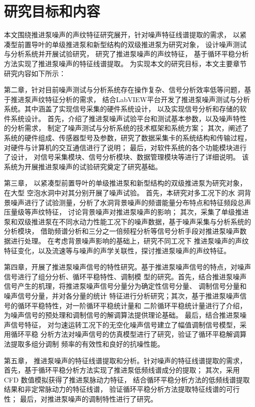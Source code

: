 \section{研究目标和内容}
本文围绕推进泵噪声的声纹特征研究展开，针对噪声特征线谱提取的需求，
以紧凑型前置导叶的单级推进泵和新型结构的双级推进泵为研究对象，
设计噪声测试与分析系统并开展试验研究，
研究了推进泵噪声的声纹特征，
基于循环平稳分析方法实现了推进泵噪声的特征线谱提取。
为实现本文的研究目标，本文主要章节研究内容如下所示：

第二章，针对目前噪声测试与分析系统存在操作复杂、信号分析效率低等问题，基于推进泵声纹特征分析的需求，
结合LabVIEW平台开发了推进泵噪声测试与分析系统。其中涵盖了实现信号采集的硬件系统设计，
以及实现信号分析和存储的软件系统设计。
首先，介绍了推进泵噪声试验平台和测试基本参数，以及噪声特性的分析需求，
制定了噪声测试与分析系统的技术框架和系统方案；
其次，阐述了系统的硬件组成、传感器型号及参数，研究了数据采集卡的系统结构和传输过程，
对硬件与计算机的交互通信进行了说明；
最后，对软件系统的各个功能模块进行了设计，
对信号采集模块、信号分析模块、数据管理模块等进行了详细说明。
该系统为开展推进泵噪声的试验研究奠定了研究基础。

第三章，
以紧凑型前置导叶的单级推进泵和新型结构的双级推进泵为研究对象，在大型
空泡水洞中对其分别开展了噪声试验。
首先，本研究对多工况下的水
洞背景噪声进行了试验测量，分析了水洞背景噪声的频谱能量分布特点和特征频段总声压量级等声纹特征，
讨论背景噪声对推进泵噪声的影响；
其次，采集了单级推进泵和双级推进泵在不同水动力性能工况下的噪声数据，基于噪声采集与分析系统的分析模块，
借助频谱分析和三分之一倍频程分析等信号分析手段对推进泵噪声数据进行处理。
在考虑背景噪声影响的基础上，研究不同工况下
推进泵噪声的声纹特征变化，以及流速等与噪声的声学关联性，探讨推进泵噪声的声纹特征。

第四章，开展了推进泵噪声信号的特性研究。基于推进泵噪声信号的特点，对噪声信号进行了组分分析、循环平稳特性、调制模
型的研究。首先，结合推进泵噪声信号产生的机理，将推进泵噪声信号分量分为确定性信号分量、
调制信号分量和噪声信号分量，并对各分量的统计
特征进行分析研究；其次，基于推进泵噪声信号的循环平稳特性，对一阶循环平稳统计量和
二阶循环平稳统计量进行了介绍，为噪声信号的预处理和调制信号的解调算法提供理论基础。
最后，结合推进泵噪声信号特征，
对匀速运转工况下的无空化噪声信号建立了幅值调制信号模型，采用循环平稳
分析方法对噪声信号的仿真模型进行了研究，验证了循环平稳解调算法提取多组分调制
频率的有效性和良好的抗噪性能。

第五章，
推进泵噪声的特征线谱提取和分析。针对噪声的特征线谱提取的需求，
首先，基于循环平稳分析方法实现了推进泵低频线谱成分的提取；
其次，采用 CFD 数值模拟获得了推进泵脉动力特征，
结合循环平稳分析方法的低频线谱提取结果和非定常脉动力的特征线谱，
验证循环平稳分析方法提取特征线谱的可行性；
最后，对推进泵噪声的调制特性进行了研究。
